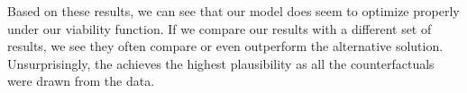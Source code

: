 \documentclass[./../../paper.tex]{subfiles}
\begin{document}
Based on these results, we can see that our model does seem to optimize properly under our viability function. If we compare our results with a different set of results, we see they often compare or even outperform the alternative solution. 
Unsurprisingly, the \ModelCBG achieves the highest plausibility as all the counterfactuals were drawn from the data. 

\end{document}
